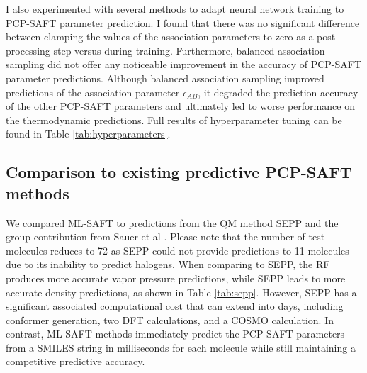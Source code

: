 I also experimented with several methods to adapt neural network training to PCP-SAFT parameter prediction. I found that there was no significant difference between clamping the values of the association parameters to zero as a post-processing step versus during training. Furthermore, balanced association sampling did not offer any noticeable improvement in the accuracy of PCP-SAFT parameter predictions. Although balanced association sampling improved predictions of the association parameter $\epsilon_{AB}$, it degraded the prediction accuracy of the other PCP-SAFT parameters and ultimately led to worse performance on the thermodynamic predictions. Full results of hyperparameter tuning can be found in Table \ref{tab:hyperparameters}.



\subsection{Comparison to existing predictive PCP-SAFT methods}

We compared ML-SAFT to predictions from the QM method SEPP\cite{Kaminski2020} and the group contribution from Sauer et al \cite{Sauer2014}.  Please note that the number of test molecules reduces to 72 as SEPP could not provide predictions to 11 molecules due to its inability to predict halogens. When comparing to SEPP, the RF produces more accurate vapor pressure predictions, while SEPP leads to more accurate density predictions, as shown in Table \ref{tab:sepp}. However, SEPP has a significant associated computational cost that can extend into days, including conformer generation, two DFT calculations, and a COSMO calculation. In contrast, ML-SAFT methods immediately predict the PCP-SAFT parameters from a SMILES string in milliseconds for each molecule while still maintaining a competitive predictive accuracy.  


